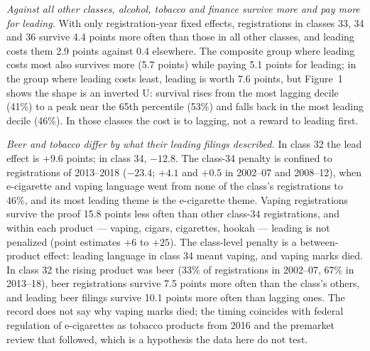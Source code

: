 \emph{Against all other classes, alcohol, tobacco and finance survive
more and pay more for leading.} With only registration-year fixed
effects, registrations in classes 33, 34 and 36 survive 4.4 points more
often than those in all other classes, and leading costs them 2.9
points against 0.4 elsewhere. The composite group where leading costs
most also survives more (5.7 points) while paying 5.1 points for
leading; in the group where leading costs least, leading is worth 7.6
points, but Figure~1 shows the shape is an inverted U: survival rises
from the most lagging decile (41\%) to a peak near the 65th percentile
(53\%) and falls back in the most leading decile (46\%). In those
classes the cost is to lagging, not a reward to leading first.

\emph{Beer and tobacco differ by what their leading filings described.}
In class 32 the lead effect is $+9.6$ points; in class 34, $-12.8$. The
class-34 penalty is confined to registrations of 2013--2018 ($-23.4$;
$+4.1$ and $+0.5$ in 2002--07 and 2008--12), when e-cigarette and vaping
language went from none of the class's registrations to 46\%, and its
most leading theme is the e-cigarette theme. Vaping registrations
survive the proof 15.8 points less often than other class-34
registrations, and within each product --- vaping, cigars, cigarettes,
hookah --- leading is not penalized (point estimates $+6$ to $+25$).
The class-level penalty is a between-product effect: leading language
in class 34 meant vaping, and vaping marks died. In class 32 the rising
product was beer (33\% of registrations in 2002--07, 67\% in 2013--18),
beer registrations survive 7.5 points more often than the class's
others, and leading beer filings survive 10.1 points more often than
lagging ones. The record does not say why vaping marks died; the
timing coincides with federal regulation of e-cigarettes as tobacco
products from 2016 and the premarket review that followed, which is a
hypothesis the data here do not test.
